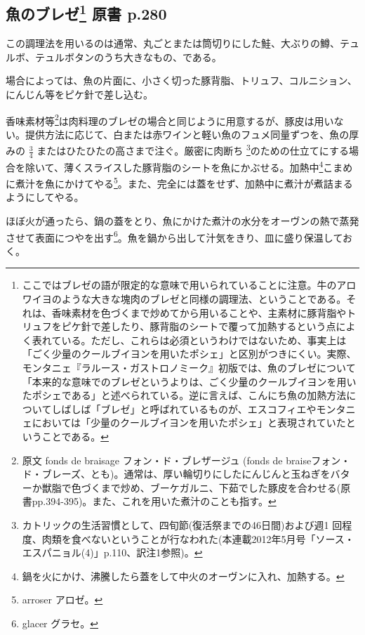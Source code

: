 \hypertarget{ux9b5aux306eux30d6ux30ecux30bc17-ux539fux66f8-p.280}{%
\subsection[魚のブレゼ 原書 p.280]{\texorpdfstring{魚のブレゼ\footnote{ここではブレゼの語が限定的な意味で用いられていることに注意。牛のアロワイヨのような大きな塊肉のブレゼと同様の調理法、ということである。それは、香味素材を色づくまで炒めてから用いることや、主素材に豚背脂やトリュフをピケ針で差したり、豚背脂のシートで覆って加熱するという点によく表れている。ただし、これらは必須というわけではないため、事実上は「ごく少量のクールブイヨンを用いたポシェ」と区別がつきにくい。実際、モンタニェ『ラルース・ガストロノミーク』初版では、魚のブレゼについて「本来的な意味でのブレゼというよりは、ごく少量のクールブイヨンを用いたポシェである」と述べられている。逆に言えば、こんにち魚の加熱方法についてしばしば「ブレゼ」と呼ばれているものが、エスコフィエやモンタニェにおいては「少量のクールブイヨンを用いたポシェ」と表現されていたということである。}
原書
p.280}{魚のブレゼ 原書 p.280}}\label{ux9b5aux306eux30d6ux30ecux30bc17-ux539fux66f8-p.280}}

この調理法を用いるのは通常、丸ごとまたは筒切りにした鮭、大ぶりの鱒、テュルボ、テュルボタンのうち大きなもの、である。

場合によっては、魚の片面に、小さく切った豚背脂、トリュフ、コルニション、にんじん等をピケ針で差し込む。

香味素材等\footnote{原文 fonds de braisage フォン・ド・ブレザージュ
  (fonds de
  braiseフォン・ド・ブレーズ、とも)。通常は、厚い輪切りにしたにんじんと玉ねぎをバターか獣脂で色づくまで炒め、ブーケガルニ、下茹でした豚皮を合わせる(原書pp.394-395)。また、これを用いた煮汁のことも指す。}は肉料理のブレゼの場合と同じように用意するが、豚皮は用いない。提供方法に応じて、白または赤ワインと軽い魚のフュメ同量ずつを、魚の厚みの
\(\frac{3}{4}\) またはひたひたの高さまで注ぐ。厳密に肉断ち \footnote{カトリックの生活習慣として、四旬節(復活祭までの46日間)および週1
  回程度、肉類を食べないということが行なわれた(本連載2012年5月号「ソース・エスパニョル(4)」p.110、訳注1参照)。}のための仕立てにする場合を除いて、薄くスライスした豚背脂のシートを魚にかぶせる。加熱中\footnote{鍋を火にかけ、沸騰したら蓋をして中火のオーヴンに入れ、加熱する。}こまめに煮汁を魚にかけてやる\footnote{arroser
  アロゼ。}。また、完全には蓋をせず、加熱中に煮汁が煮詰まるようにしてやる。

ほぼ火が通ったら、鍋の蓋をとり、魚にかけた煮汁の水分をオーヴンの熱で蒸発させて表面につやを出す\footnote{glacer
  グラセ。}。魚を鍋から出して汁気をきり、皿に盛り保温しておく。

